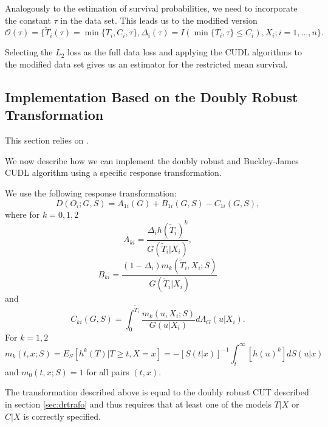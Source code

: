 \documentclass[12pt, a4paper]{article}
\theoremstyle{definition}
\theoremstyle{plain}
\numberwithin{equation}{section}
\numberwithin{figure}{section}
\numberwithin{table}{section}
\begin{document}
	Analogously to the estimation of survival probabilities, we need to incorporate the constant $\tau$ in the data set.
	This leads us to the modified version	
	\begin{equation*}
		\mathcal{O}(\tau) = \{\tilde{T}_i(\tau) = \min\{T_i, C_i, \tau\}, \Delta_i(\tau) = I(\min\{T_i, \tau\}\leq C_i), X_i; i = 1, \dots , n\}.
	\end{equation*}
	
	Selecting the $L_2$ loss as the full data loss and applying the CUDL algorithms to the modified data set gives us an estimator for the restricted mean survival.
	
	\subsection{Implementation Based on the Doubly Robust Transformation}
	
	This section relies on \citet*{basearticle}.
	
	We now describe how we can implement the doubly robust and Buckley-James CUDL algorithm using a specific response transformation.
	
	We use the following response transformation:
	\begin{equation*}
	D(O_i; G,S) = A_{1i}(G)+B_{1i}(G,S) - C_{1i}(G,S),
	\end{equation*}
	where for $k=0,1,2$
	\begin{equation*}
	A_{ki} = \frac{\Delta_i h(\tilde{T}_i)^k}{G(\tilde{T}_i\vert X_i)},
	\end{equation*}
	\begin{equation*}
	B_{ki} = \frac{(1-\Delta_i)m_k(\tilde{T}_i, X_i; S)}{G(\tilde{T}_i\vert X_i)}
	\end{equation*}
	and
	\begin{equation*}
	C_{ki} (G,S) = \int_{0}^{\tilde{T}_i} \frac{m_k(u, X_i; S)}{G(u \vert X_i)}d\Lambda_G(u \vert X_i).
	\end{equation*}
	For $k=1,2$
	\begin{equation}\label{eq:condexp}
	m_k(t,x;S) = E_S[h^k(T) \vert T \geq t, X = x] = -[S(t\vert x)]^{-1} \int_{t}^{\infty}[h(u)^k]dS(u\vert x)
	\end{equation}
	and $m_0(t,x;S) = 1$ for all pairs $(t,x)$.
	
	The transformation described above is equal to the doubly robust CUT described in section \ref{sec:drtrafo} and thus requires that at least one of the models $T\vert X$ or $C \vert X$ is correctly specified.
	
\end{document}
